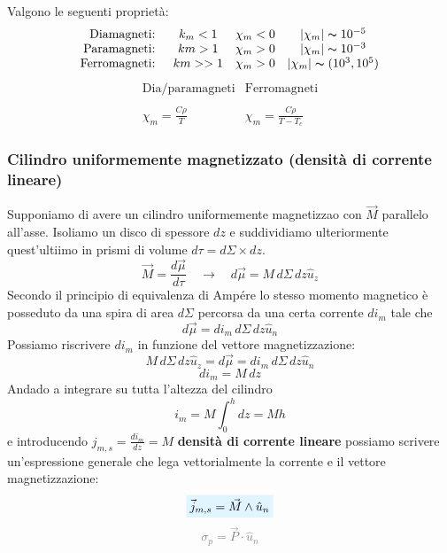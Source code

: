 \documentclass[x11names]{report}
\newcommand{\viola}[1]{%
	\colorbox{myblue}{$\displaystyle #1$}
}
\begin{document}
Valgono le seguenti proprietà:
\[
\begin{array}{rccc}
	\text{Diamagneti: } & k_m < 1 & \chi_m < 0 & |\chi_m| \thicksim 10^{-5}\\
	\text{Paramagneti: } & km > 1 & \chi_m > 0 & |\chi_m| \thicksim 10^{-3} \\
	\text{Ferromagneti: }& km >> 1 & \chi_m > 0 & |\chi_m| \thicksim (10^{3},10^{5})\\
\end{array}
\]
\[
\begin{array}{cc}
	\text{Dia/paramagneti} & \text{Ferromagneti} \\ & \\
	\chi_m = \frac{C\rho}{T} & \chi_m = \frac{C\rho}{T-T_c}
\end{array}
\]

\subsubsection{Cilindro uniformemente magnetizzato (densità di corrente lineare)}
Supponiamo di avere un cilindro uniformemente magnetizzao con \(\vec{M}\) parallelo all'asse. Isoliamo un disco di spessore \(dz\) e suddividiamo ulteriormente quest'ultiimo in prismi di volume \(d\tau = d\Sigma \times dz\).
\[
\vec{M} = \frac{d\vec{\mu}}{d\tau} \quad \to \quad d\vec{\mu} = M \, d\Sigma \, dz \hat{u}_z
\]
Secondo il principio di equivalenza di Ampére lo stesso momento magnetico è posseduto da una spira di area \(d\Sigma\) percorsa da una certa corrente \(di_m\) tale che 
\[
d\vec{\mu} = di_m \, d\Sigma \, dz \hat{u}_n 
\]
Possiamo riscrivere \(di_m\) in funzione del vettore magnetizzazione:
\[
M \, d\Sigma \, dz \hat{u}_z=d\vec{\mu} = di_m \, d\Sigma \, dz \hat{u}_n 
\]
\[
di_m = M \, dz
\]
Andado a integrare su tutta l'altezza del cilindro
\[
i_m = M \int_{0}^{h} dz = Mh
\]
e introducendo \(j_{m,s} = \frac{di_m}{dz} = M\) \textbf{densità di corrente lineare} possiamo scrivere un'espressione generale che lega vettorialmente la corrente e il vettore magnetizzazione:
\begin{equation}
	\viola{\vec{j}_{m,s} = \vec{M}\wedge\hat{u}_n} 
\end{equation}
\vspace{-0.4cm}
 \textcolor{gray}{\[
\sigma_p = \vec{P}\cdot\hat{u}_n
\]}
\end{document}
